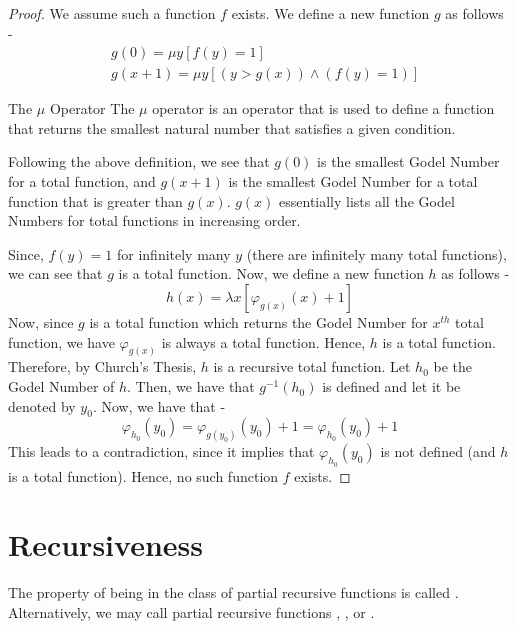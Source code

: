 \documentclass[openany]{book}
\begin{document}
\begin{proof}
    We assume such a function $f$ exists. We define a new function $g$ as follows - 
    \begin{align*}
        &g(0) = \mu y[f(y) = 1] \\
        &g(x+1) = \mu y[(y > g(x)) \land (f(y) = 1)]
    \end{align*}
    \begin{mynote}
    \begin{mydefinition}{The $\mu$ Operator}
        The $\mu$ operator is an operator that is used to define a function that returns the smallest natural number that satisfies a given condition.
    \end{mydefinition}
    Following the above definition, we see that $g(0)$ is the smallest Godel Number for a total function, and $g(x+1)$ is the smallest Godel Number for a total function that is greater than $g(x)$. $g(x)$ essentially lists all the Godel Numbers for total functions in increasing order. 
    \end{mynote}
    Since, $f(y) = 1$ for infinitely many $y$ (there are infinitely many total functions), we can see that $g$ is a total function. Now, we define a new function $h$ as follows - 
    $$h(x) = \lambda x[\varphi_{g(x)}(x) + 1]$$
    Now, since $g$ is a total function which returns the Godel Number for $x^{th}$ total function, we have $\varphi_{g(x)}$ is always a total function. Hence, $h$ is a total function. Therefore, by Church's Thesis, $h$ is a recursive total function. Let $h_0$ be the Godel Number of $h$. Then, we have that $g^{-1}(h_0)$ is defined and let it be denoted by $y_0$. Now, we have that -
    $$\varphi_{h_0}(y_0) = \varphi_{g(y_0)}(y_0) + 1 = \varphi_{h_0}(y_0) + 1$$
    This leads to a contradiction, since it implies that $\varphi_{h_0}(y_0)$ is not defined (and $h$ is a total function). Hence, no such function $f$ exists. 
\end{proof}
\section{Recursiveness}
The property of being in the class of partial recursive functions is called . Alternatively, we may call partial recursive functions , , or .
\end{document}
